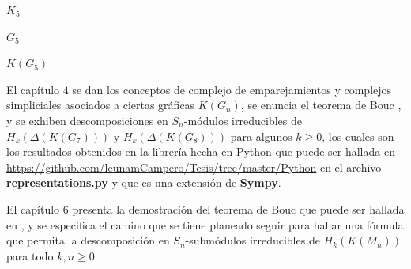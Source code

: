 \documentclass[12pt]{book}
\theoremstyle{definition}
\newcounter{in}
\newcounter{ini}
\begin{document}
\begin{center}
  \begin{minipage}{0.3\linewidth}
    \centering
  
    $K_{5}$
  \end{minipage}
  \bigskip

\begin{minipage}{0.33\linewidth}
  \centering

  $G_{5}$
\end{minipage}\quad
\begin{minipage}{0.33\linewidth}
  \centering
 
  $K(G_{5})$
\end{minipage}
\end{center} 


El capítulo $4$ se dan los conceptos de complejo de emparejamientos y
complejos simpliciales asociados a ciertas gráficas $K(G_n)$, se
enuncia el teorema de Bouc \cite{dong2002combinatorial}, y se exhiben
descomposiciones en $S_n$-módulos irreducibles de
$H_k(\Delta(K(G_7)))$ y $H_k(\Delta(K(G_8)))$ para algunos $k \geq 0$,
los cuales son los resultados obtenidos en la librería hecha en Python
que puede ser hallada en
\url{https://github.com/leunamCampero/Tesis/tree/master/Python} en el
archivo \textbf{representations.py} y que es una extensión de
\textbf{Sympy}.


El capítulo $6$ presenta la demostración del teorema de Bouc que puede
ser hallada en \cite{wachs2006poset}, y se especifica el camino que se
tiene planeado seguir para hallar una fórmula que permita la
descomposición en $S_n$-submódulos irreducibles de $H_k(K(M_n))$ para
todo $k,n \geq 0$.
\end{document}
